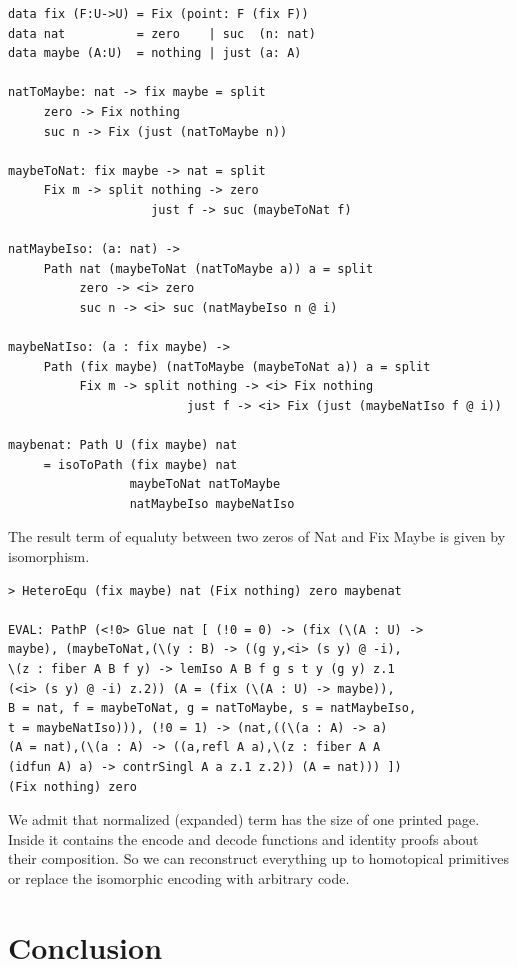 \documentclass{article}
\begin{document}
\begin{lstlisting}[mathescape=true]
data fix (F:U->U) = Fix (point: F (fix F))
data nat          = zero    | suc  (n: nat)
data maybe (A:U)  = nothing | just (a: A)

natToMaybe: nat -> fix maybe = split
     zero -> Fix nothing
     suc n -> Fix (just (natToMaybe n))

maybeToNat: fix maybe -> nat = split
     Fix m -> split nothing -> zero
                    just f -> suc (maybeToNat f)

natMaybeIso: (a: nat) ->
     Path nat (maybeToNat (natToMaybe a)) a = split
          zero -> <i> zero
          suc n -> <i> suc (natMaybeIso n @ i)

maybeNatIso: (a : fix maybe) ->
     Path (fix maybe) (natToMaybe (maybeToNat a)) a = split
          Fix m -> split nothing -> <i> Fix nothing
                         just f -> <i> Fix (just (maybeNatIso f @ i))

maybenat: Path U (fix maybe) nat
     = isoToPath (fix maybe) nat
                 maybeToNat natToMaybe
                 natMaybeIso maybeNatIso
\end{lstlisting}

The result term of equaluty between two zeros of Nat and Fix Maybe is given by isomorphism.

\begin{lstlisting}[mathescape=true]
> HeteroEqu (fix maybe) nat (Fix nothing) zero maybenat

EVAL: PathP (<!0> Glue nat [ (!0 = 0) -> (fix (\(A : U) ->
maybe), (maybeToNat,(\(y : B) -> ((g y,<i> (s y) @ -i),
\(z : fiber A B f y) -> lemIso A B f g s t y (g y) z.1
(<i> (s y) @ -i) z.2)) (A = (fix (\(A : U) -> maybe)),
B = nat, f = maybeToNat, g = natToMaybe, s = natMaybeIso,
t = maybeNatIso))), (!0 = 1) -> (nat,((\(a : A) -> a)
(A = nat),(\(a : A) -> ((a,refl A a),\(z : fiber A A
(idfun A) a) -> contrSingl A a z.1 z.2)) (A = nat))) ])
(Fix nothing) zero
\end{lstlisting}

We admit that normalized (expanded) term has the size of one printed page.
Inside it contains the encode and decode functions and identity proofs
about their composition. So we can reconstruct everything up to homotopical
primitives or replace the isomorphic encoding with arbitrary code.

\section{Conclusion}
\end{document}
